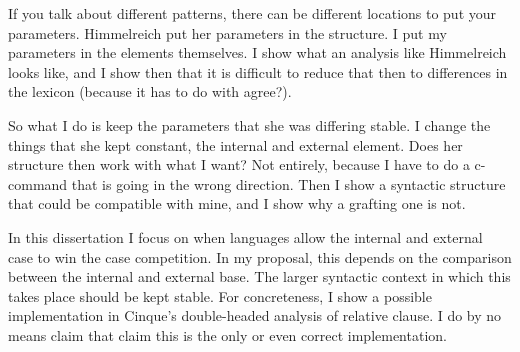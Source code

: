 If you talk about different patterns, there can be different locations to put your parameters. Himmelreich put her parameters in the structure. I put my parameters in the elements themselves. I show what an analysis like Himmelreich looks like, and I show then that it is difficult to reduce that then to differences in the lexicon (because it has to do with agree?).

So what I do is keep the parameters that she was differing stable. I change the things that she kept constant, the internal and external element. Does her structure then work with what I want? Not entirely, because I have to do a c-command that is going in the wrong direction.
Then I show a syntactic structure that could be compatible with mine, and I show why a grafting one is not.



In this dissertation I focus on when languages allow the internal and external case to win the case competition. In my proposal, this depends on the comparison between the internal and external base. The larger syntactic context in which this takes place should be kept stable. For concreteness, I show a possible implementation in Cinque's double-headed analysis of relative clause. I do by no means claim that claim this is the only or even correct implementation.



